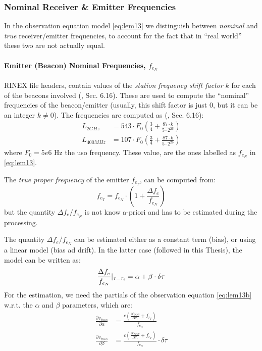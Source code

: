 \subsubsection{Nominal Receiver \& Emitter Frequencies}\label{ssec:nominal-frequencies}
In the observation equation model \autoref{eq:lem13} we distinguish between 
\emph{nominal} and \emph{true} receiver/emitter frequencies, to account for 
the fact that in ``real world'' these two are not actually equal.

\paragraph{Emitter (Beacon) Nominal Frequencies, $f_{e_N}$}\label{par:beacon-nominal-frequencies}
RINEX file headers, contain values of the \emph{station frequency shift 
factor} $k$ for each of the beacons involved (\cite{DORISRNX3}, Sec. 6.16). 
These are used to compute the ``nominal'' frequencies of the beacon/emitter 
(usually, this shift factor is just $0$, but it can be an integer 
$k \neq 0$). The frequencies are computed as (\cite{DORISRNX3}, Sec. 6.16):
\begin{equation}
  \begin{aligned}
    L_{2GHz}   &= 543 \cdot F_0 \left( \frac{3}{4} + \frac{87\cdot k}{5 \cdot 2^{26}} \right) \\
    L_{400MHz} &= 107 \cdot F_0 \left( \frac{3}{4} + \frac{87\cdot k}{5 \cdot 2^{26}} \right) 
    \label{eq:nominal-freq}
  \end{aligned}
\end{equation}
where $F_0 = 5e6 \text{ Hz}$ the \gls{uso} frequency. These value, are the ones 
labelled as $f_{e_N}$ in \autoref{eq:lem13}.

The \emph{true proper frequency} of the emitter $f_{e_T}$, can be computed 
from:
\begin{equation}
  f_{e_T} = f_{e_N} \cdot \left( 1 + \frac{\Delta f_e}{f_{e_N}} \right)
\end{equation}
but the quantity $\Delta f_e / f_{e_N}$ is not know a-priori and has to be 
estimated during the processing.

The quantity $\Delta f_e / f_{e_N}$  can be estimated either as a constant term (bias), 
or using a linear model (bias ad drift). In the latter case (followed in this Thesis), 
the model can be written as:
\begin{equation}
  \frac{\Delta f_e}{f_{e_N}}|_{\tau=\tau _i} = \alpha + \beta \cdot \delta \tau
\end{equation}
For the estimation, we need the partials of the observation equation \autoref{eq:lem13b} 
w.r.t. the $\alpha$ and $\beta$ parameters, which are:
\begin{equation}
  \begin{aligned}
  \frac{\partial v_{theo}}{\partial \alpha} &= 
    \frac{c(\frac{N_{DOP}}{\Delta\tau_r} + f_{r_T})}{f_{e_N}} \\
  \frac{\partial v_{theo}}{\partial \beta} &= 
    \frac{c(\frac{N_{DOP}}{\Delta\tau_r} + f_{r_T})}{f_{e_N}} \cdot \delta \tau
  \end{aligned}
\end{equation}

